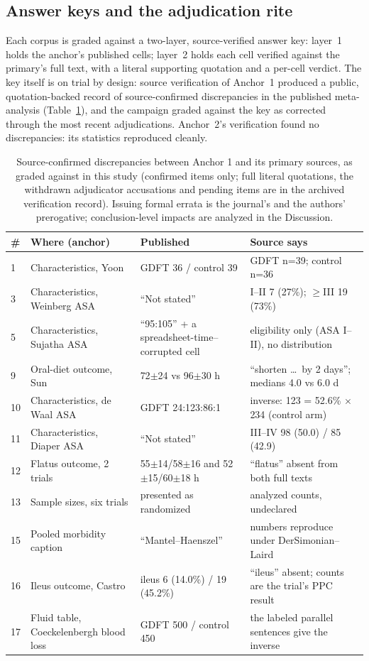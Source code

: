 \documentclass[11pt]{article}
\begin{document}
\subsection{Answer keys and the adjudication rite}
Each corpus is graded against a two-layer, source-verified answer key: layer~1 holds the anchor's published cells; layer~2 holds each cell verified against the primary's full text, with a literal supporting quotation and a per-cell verdict. The key itself is on trial by design: source verification of Anchor~1 produced a public, quotation-backed record of source-confirmed discrepancies in the published meta-analysis (Table~\ref{tab:errata}), and the campaign graded against the key as corrected through the most recent adjudications. Anchor~2's verification found no discrepancies: its statistics reproduced cleanly.

\begin{table}[H]
\centering\footnotesize
\caption{Source-confirmed discrepancies between Anchor 1 and its primary sources, as graded against in this study (confirmed items only; full literal quotations, the withdrawn adjudicator accusations and pending items are in the archived verification record). Issuing formal errata is the journal's and the authors' prerogative; conclusion-level impacts are analyzed in the Discussion.}
\label{tab:errata}
\begin{tabular}{@{}p{0.5cm}p{3.4cm}p{4.2cm}p{5.9cm}@{}}
\toprule
\# & Where (anchor) & Published & Source says \\
\midrule
1 & Characteristics, Yoon & GDFT 36 / control 39 & GDFT n=39; control n=36 \\
3 & Characteristics, Weinberg ASA & ``Not stated'' & I--II 7 (27\%); $\geq$III 19 (73\%) \\
5 & Characteristics, Sujatha ASA & ``95:105'' + a spreadsheet-time--corrupted cell & eligibility only (ASA I--II), no distribution \\
9 & Oral-diet outcome, Sun & 72$\pm$24 vs 96$\pm$30 h & ``shorten \ldots\ by 2 days''; medians 4.0 vs 6.0 d \\
10 & Characteristics, de Waal ASA & GDFT 24:123:86:1 & inverse: 123 = 52.6\% $\times$ 234 (control arm) \\
11 & Characteristics, Diaper ASA & ``Not stated'' & III--IV 98 (50.0) / 85 (42.9) \\
12 & Flatus outcome, 2 trials & 55$\pm$14/58$\pm$16 and 52$\pm$15/60$\pm$18 h & ``flatus'' absent from both full texts \\
13 & Sample sizes, six trials & presented as randomized & analyzed counts, undeclared \\
15 & Pooled morbidity caption & ``Mantel--Haenszel'' & numbers reproduce under DerSimonian--Laird \\
16 & Ileus outcome, Castro & ileus 6 (14.0\%) / 19 (45.2\%) & ``ileus'' absent; counts are the trial's PPC result \\
17 & Fluid table, Coeckelenbergh blood loss & GDFT 500 / control 450 & the labeled parallel sentences give the inverse \\
\bottomrule
\end{tabular}
\end{table}
\end{document}
